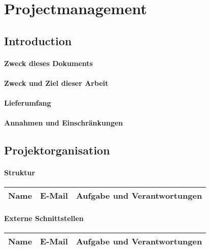 \chapter{Projectmanagement}

\section{Introduction}

\subsubsection*{Zweck dieses Dokuments}

\subsubsection*{Zweck und Ziel dieser Arbeit}

\subsubsection*{Lieferumfang}

\subsubsection*{Annahmen und Einschränkungen}

\section{Projektorganisation}

\subsubsection*{Struktur}

\begin{tabular}[t]{|l|l|l|} \hline
\textbf{Name} & \textbf{E-Mail} & \textbf{Aufgabe und Verantwortungen} \\ \hline \hline
\end{tabular}

\subsubsection*{Externe Schnittstellen}

\begin{tabular}[t]{|l|l|l|} \hline
\textbf{Name} & \textbf{E-Mail} & \textbf{Aufgabe und Verantwortungen} \\ \hline \hline
\end{tabular}

